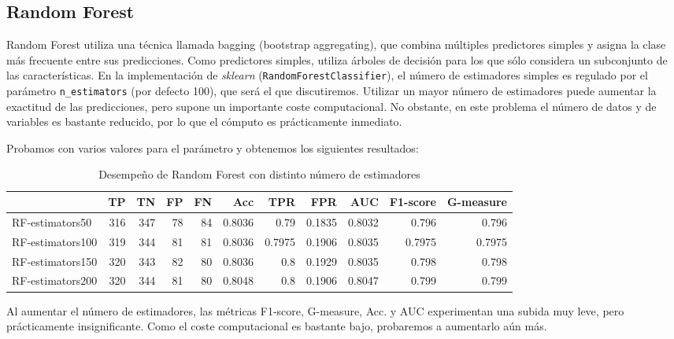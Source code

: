 \documentclass{article}
\begin{document}
\subsection{Random Forest}

Random Forest utiliza una técnica llamada bagging (bootstrap
aggregating), que combina múltiples predictores simples y asigna la
clase más frecuente entre sus predicciones. Como predictores simples,
utiliza árboles de decisión para los que sólo considera un subconjunto
de las características. En la implementación de \textit{sklearn}
(\texttt{RandomForestClassifier}), el número de estimadores simples es
regulado por el parámetro \texttt{n\_estimators} (por defecto 100),
que será el que discutiremos. Utilizar un mayor número de estimadores
puede aumentar la exactitud de las predicciones, pero supone un
importante coste computacional. No obstante, en este problema el
número de datos y de variables es bastante reducido, por lo que el
cómputo es prácticamente inmediato.

Probamos con varios valores para el parámetro y obtenemos los
siguientes resultados:

\begin{table}[H]
\centering
\caption{Desempeño de Random Forest con distinto número de estimadores}
\label{tab:rf-tuning}
\begin{tabular}{|lrrrrrrrrrr|}
\hline
 & TP & TN & FP & FN & Acc & TPR & FPR & AUC & F1-score & G-measure\\ \hline
RF-estimators50 & 316 & 347 & 78 & 84 & 0.8036 & 0.79 & 0.1835 & 0.8032 & 0.796 & 0.796\\
RF-estimators100 & 319 & 344 & 81 & 81 & 0.8036 & 0.7975 & 0.1906 & 0.8035 & 0.7975 & 0.7975\\
RF-estimators150 & 320 & 343 & 82 & 80 & 0.8036 & 0.8 & 0.1929 & 0.8035 & 0.798 & 0.798\\
RF-estimators200 & 320 & 344 & 81 & 80 & 0.8048 & 0.8 & 0.1906 & 0.8047 & 0.799 & 0.799\\
\hline
\end{tabular}
\end{table}

Al aumentar el número de estimadores, las métricas F1-score,
G-measure, Acc. y AUC experimentan una subida muy leve, pero
prácticamente insignificante. Como el coste computacional es bastante
bajo, probaremos a aumentarlo aún más.
\end{document}

